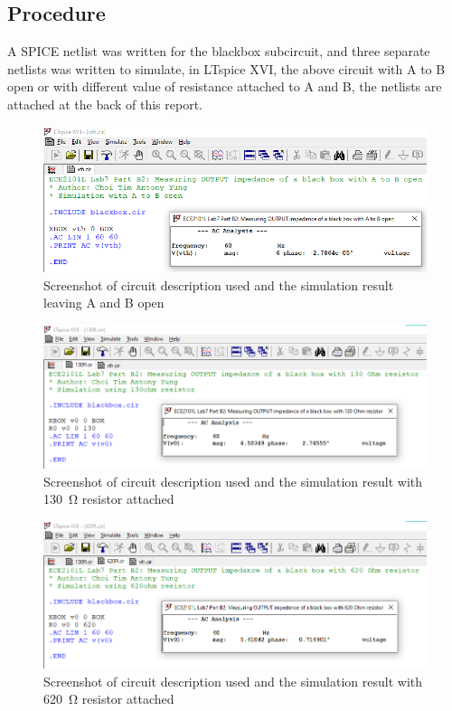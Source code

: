 \documentclass{article}
\begin{document}
\subsection*{Procedure}
A SPICE netlist was written for the blackbox subcircuit, and three separate netlists was written to simulate, in LTspice XVI, the above circuit with A to B open or with different value of resistance attached to A and B, the netlists are attached at the back of this report. 

\begin{figure}[H]
    \centering
        \includegraphics[scale=0.5]{sim_vth.png}
        \caption{Screenshot of circuit description used and the simulation result leaving A and B open}
\end{figure}

\begin{figure}[H]
    \centering
        \includegraphics[scale=0.5]{sim_v0_130.png}
        \caption{Screenshot of circuit description used and the simulation result with \SI{130}{\ohm} resistor attached}
\end{figure}

\begin{figure}[H]
    \centering
        \includegraphics[scale=0.5]{sim_v0_620.png}
        \caption{Screenshot of circuit description used and the simulation result with \SI{620}{\ohm} resistor attached}
\end{figure}
\end{document}
